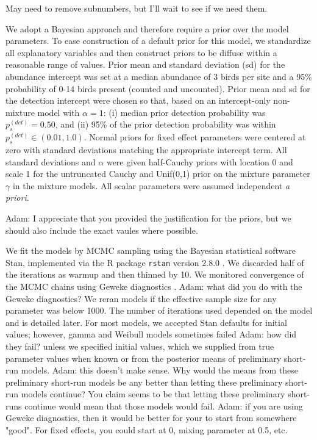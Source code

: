 \documentclass[useAMS,usenatbib,referee,12pt]{article}
\newcommand{\jarad}[1]{{\color{Orange} #1}}
\begin{document}
\jarad{May need to remove subnumbers, but I'll wait to see if we need them.}

 
We adopt a Bayesian approach and therefore require a prior over the model parameters.
To ease construction of a default prior for this model, we standardize all explanatory variables and then construct priors to be diffuse within a reasonable range of values.
Prior mean and standard deviation (sd) for the abundance intercept was set at a median abundance of 3 birds per site and a 95\% probability of 0-14 birds present (counted and uncounted).  
Prior mean and sd for the detection intercept were chosen so that, based on an intercept-only non-mixture model with $\alpha=1$: (i) median prior detection probability was $p_{s}^{(det)} = 0.50$, and (ii) 95\% of the prior detection probability was within $p_{s}^{(det)} \in (0.01, 1.0)$.  
Normal priors for fixed effect parameters were centered at zero with standard deviations matching the appropriate intercept term.  
All standard deviations and $\alpha$ were given half-Cauchy priors with location 0 and scale 1 for the untruncated Cauchy and Unif(0,1) prior on the mixture parameter $\gamma$ in the mixture models.
All scalar parameters were assumed independent \emph{a priori}. 


\jarad{Adam: I appreciate that you provided the justification for the priors, but we should also include the exact vaules where possible.}


We fit the models by MCMC sampling using the Bayesian statistical software Stan, implemented via the R package \texttt{rstan} version 2.8.0 \citep{Rstan2015}.  
We discarded half of the iterations as warmup and then thinned by 10.  
We monitored convergence of the MCMC chains using Geweke diagnostics \citep{Geweke1991}. \jarad{Adam: what did you do with the Geweke diagnostics?}  
We reran models if the effective sample size for any parameter was below 1000.  
The number of iterations used depended on the model and is detailed later. 
For most models, we accepted Stan defaults for initial values; however, gamma and Weibull models sometimes failed \jarad{Adam: how did they fail?} unless we specified initial values, which we supplied from true parameter values when known or from the posterior means of preliminary short-run models. \jarad{Adam: this doesn't make sense. Why would the means from these preliminary short-run models be any better than letting these preliminary short-run models continue? You claim seems to be that letting these preliminary short-runs continue would mean that those models would fail.}
\jarad{Adam: if you are using Geweke diagnostics, then it would be better for your to start from somewhere "good". For fixed effects, you could start at 0, mixing parameter at 0.5, etc.} 
\end{document}
